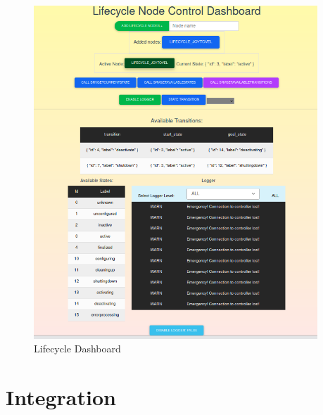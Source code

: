 \begin{figure}[H]
	\centering
	\includegraphics[width=0.95\textwidth]{"Bilder/lifecycle-dashboard.png"}
	\caption{Lifecycle Dashboard}
	\label{fig:Background:LifecycleDashboard}					
\end{figure}

\section{Integration}
\label{Implementierung:Integration}


	
		
		
	
	